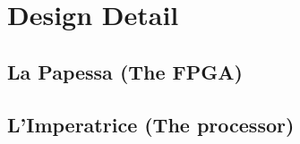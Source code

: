 \chapter{Design Detail} %
\label{cha:system_design}


\section{La Papessa (The FPGA)} %
\label{sec:la_papessa_fpga}





\section{L'Imperatrice (The processor)} %
\label{sec:l_imperatrice_processor}





